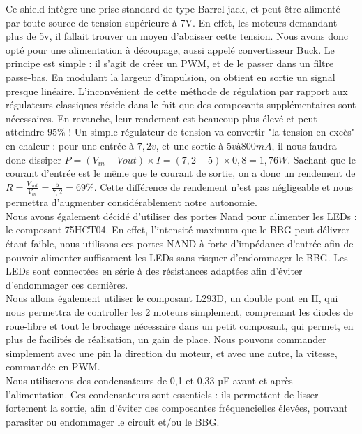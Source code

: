 			Ce shield intègre une prise standard de type Barrel jack, et peut être alimenté par toute source de tension supérieure à 7V. 
			En effet, les moteurs demandant plus de 5v, il fallait trouver un moyen d'abaisser cette tension. Nous avons donc opté pour une alimentation à découpage, aussi appelé convertisseur Buck. Le principe est simple : il s'agit de créer un PWM, et de le passer dans un filtre passe-bas. En modulant la largeur d'impulsion, on obtient en sortie un signal presque linéaire. L'inconvénient de cette méthode de régulation par rapport aux régulateurs classiques réside dans le fait que des composants supplémentaires sont nécessaires. En revanche, leur rendement est beaucoup plus élevé et peut atteindre 95\% \cite{bib25} !
			Un simple régulateur de tension va convertir "la tension en excès" en chaleur : pour une entrée à $7,2v$, et une sortie à $5v à 800mA$, il nous faudra donc dissiper $P = (V_{in} - V{out}) \times I = (7,2 - 5) \times 0,8 = 1,76W$. Sachant que le courant d'entrée est le même que le courant de sortie, on a donc un rendement de $R = \frac{V_{out}}{V_{in}} = \frac{5}{7,2} = 69\%$. Cette différence de rendement n'est pas négligeable et nous permettra d'augmenter considérablement notre autonomie.\\

			Nous avons également décidé d'utiliser des portes Nand pour alimenter les LEDs : le composant 75HCT04. En effet, l'intensité maximum que le BBG peut délivrer étant faible, nous utilisons ces portes NAND à forte d'impédance d'entrée afin de pouvoir alimenter suffisament les LEDs sans risquer d'endommager le BBG. Les LEDs sont connectées en série à des résistances adaptées afin d'éviter d'endommager ces dernières.\\

			Nous allons également utiliser le composant L293D, un double pont en H, qui nous permettra de controller les 2 moteurs simplement, comprenant les diodes de roue-libre et tout le brochage nécessaire dans un petit composant, qui permet, en plus de facilités de réalisation, un gain de place. Nous pouvons commander simplement avec une pin la direction du moteur, et avec une autre, la vitesse, commandée en PWM.\\

			Nous utiliserons des condensateurs de 0,1 et 0,33 µF avant et après l'alimentation. Ces condensateurs sont essentiels : ils permettent de lisser fortement la sortie, afin d'éviter des composantes fréquencielles élevées, pouvant parasiter ou endommager le circuit et/ou le BBG.\\

